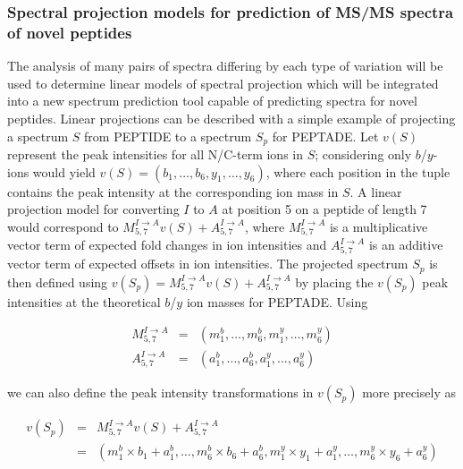 \documentclass[arial,11pt]{article}
\begin{document}
\subsubsection{Spectral projection models for prediction of MS/MS spectra of novel peptides}\label{trd.snets.aim.sp.proj}

The analysis of many pairs of spectra differing by each type of variation will be used to determine linear models of spectral projection which will be integrated into a new spectrum prediction tool capable of predicting spectra for novel peptides.
%
Linear projections can be described with a simple example of projecting a spectrum $S$ from PEPTIDE to a spectrum $S_p$ for PEPTADE. Let $v(S)$ represent the peak intensities for all N/C-term ions in $S$; considering only $b$/$y$-ions would yield $v(S)=(b_1,\ldots,b_6,y_1,\ldots,y_6)$, where each position in the tuple contains the peak intensity at the corresponding ion mass in $S$. A linear projection model for converting $I$ to $A$ at position 5 on a peptide of length 7 would correspond to $M^{I\rightarrow A}_{5,7} v(S) + A^{I\rightarrow A}_{5,7}$, where $M^{I\rightarrow A}_{5,7}$ is a multiplicative vector term of expected fold changes in ion intensities and $A^{I\rightarrow A}_{5,7}$ is an additive vector term of expected offsets in ion intensities. The projected spectrum $S_p$ is then defined using $v(S_p) = M^{I\rightarrow A}_{5,7} v(S) + A^{I\rightarrow A}_{5,7}$ by placing the $v(S_p)$ peak intensities at the theoretical $b$/$y$ ion masses for PEPTADE. Using

\begin{eqnarray*}
M^{I\rightarrow A}_{5,7} & = & (m^b_1,\ldots,m^b_6,m^y_1,\ldots,m^y_6) \\
A^{I\rightarrow A}_{5,7} & = & (a^b_1,\ldots,a^b_6,a^y_1,\ldots,a^y_6)
\end{eqnarray*}

we can also define the peak intensity transformations in $v(S_p)$ more precisely as

\begin{eqnarray*}
v(S_p) & = & M^{I\rightarrow A}_{5,7} v(S) + A^{I\rightarrow A}_{5,7} \\
       & = & (m^b_1\times b_1+a^b_1,\ldots,m^b_6\times b_6+a^b_6,m^y_1\times y_1+a^y_1,\ldots,m^y_6\times y_6+a^y_6)
\end{eqnarray*}
\end{document}
